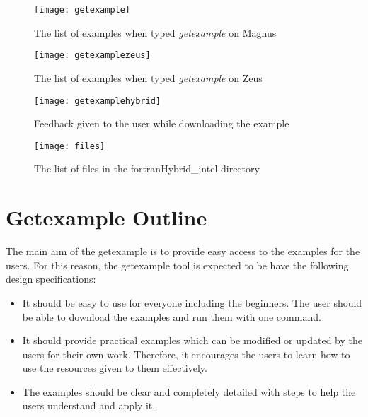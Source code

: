 
\begin{figure}[!ht]
\begin{center}
\texttt{[image: getexample]}
\caption{The list of examples when typed \emph{getexample} on Magnus}
\end{center}
\end{figure}

\begin{figure}[!ht]
\begin{center}
\texttt{[image: getexamplezeus]}
\caption{The list of examples when typed \emph{getexample} on Zeus}
\end{center}
\end{figure}

\begin{figure}[!ht]
\begin{center}
\texttt{[image: getexamplehybrid]}
\caption{Feedback given to the user while downloading the example}
\end{center}
\end{figure}

\begin{figure}[!ht]
\begin{center}
\texttt{[image: files]}
\caption{The list of files in the fortranHybrid\_intel directory}
\end{center}
\end{figure}

\clearpage

\section{Getexample Outline}

The main aim of the getexample is to provide easy access to the examples for the users. For this reason, the getexample tool is expected to be have the 
following design specifications:

\begin{itemize}
\item It should be easy to use for everyone including the beginners. The user should be able to download the examples and run them with one command.
\item It should provide practical examples which can be modified or updated by the users for their own work. Therefore, it encourages the users to learn
how to use the resources given to them effectively.
\item The examples should be clear and completely detailed with steps to help the users understand and apply it.
\end{itemize}

